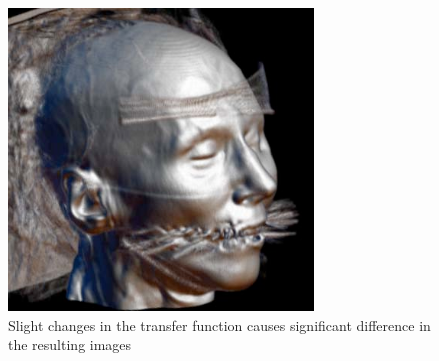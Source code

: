 \documentclass{egpubl}
\begin{document}
\begin{figure}
	\begin{minipage}{0.2\textwidth}
		\centering
		\includegraphics[width=1\linewidth]{images/glk_transfunction_2.png}
	\end{minipage}    
	\caption{Slight changes in the transfer function causes significant difference in the resulting images \cite{kindlmann_transfer_2002}}
	\label{fig:multiple_glk_transfunction}
\end{figure}
\end{document}
